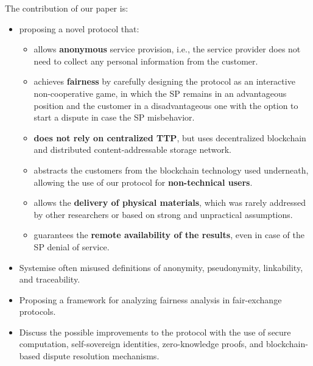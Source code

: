 The contribution of our paper is:
\begin{itemize}
\item proposing a novel protocol that:
  \begin{itemize}
  \item allows \textbf{anonymous} service provision, i.e., the service provider does not need to collect any personal information from the customer.
  \item achieves \textbf{fairness} by carefully designing the protocol as an interactive non-cooperative game, in which the SP remains in an advantageous position and the customer in a disadvantageous one with the option to start a dispute in case the SP misbehavior.
  \item \textbf{does not rely on centralized TTP}, but uses decentralized blockchain and distributed content-addressable storage network.
  \item abstracts the customers from the blockchain technology used underneath, allowing the use of our protocol for \textbf{non-technical users}.
  \item allows the \textbf{delivery of physical materials}, which was rarely addressed by other researchers or based on strong and unpractical assumptions.
  \item guarantees the \textbf{remote availability of the results}, even in case of the SP denial of service.
  \end{itemize} 
\item Systemise often misused definitions of anonymity, pseudonymity, linkability, and traceability.
\item Proposing a framework for analyzing fairness analysis in fair-exchange protocols.
\item Discuss the possible improvements to the protocol with the use of secure computation, self-sovereign identities, zero-knowledge proofs, and blockchain-based dispute resolution mechanisms.
\end{itemize} 


